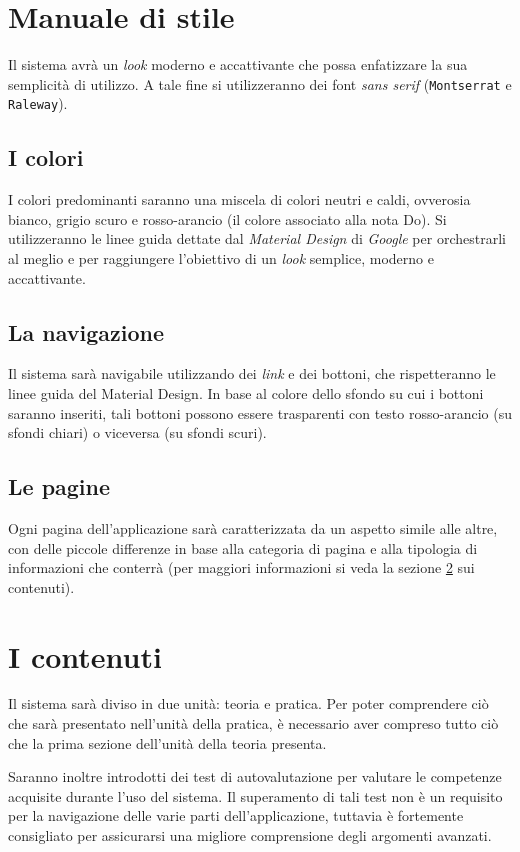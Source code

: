 \section{Manuale di stile}
Il sistema avrà un \emph{look} moderno e accattivante che possa enfatizzare la
sua semplicità di utilizzo. A tale fine si utilizzeranno dei font \emph{sans
serif} (\texttt{Montserrat} e \texttt{Raleway}).

\subsection{I colori}
I colori predominanti saranno una miscela di colori neutri e caldi, ovverosia
bianco, grigio scuro e rosso-arancio (il colore associato alla nota Do). Si
utilizzeranno le linee guida dettate dal \emph{Material Design} di \emph{Google}
per orchestrarli al meglio e per raggiungere l'obiettivo di un \emph{look}
semplice, moderno e accattivante.

\subsection{La navigazione}
Il sistema sarà navigabile utilizzando dei \emph{link} e dei bottoni, che
rispetteranno le linee guida del Material Design. In base al colore dello sfondo
su cui i bottoni saranno inseriti, tali bottoni possono essere trasparenti con
testo rosso-arancio (su sfondi chiari) o viceversa (su sfondi scuri).

\subsection{Le pagine} 
Ogni pagina dell'applicazione sarà caratterizzata da un aspetto simile alle
altre, con delle piccole differenze in base alla categoria di pagina e alla
tipologia di informazioni che conterrà (per maggiori informazioni si veda la
sezione \ref{sec:contenuti} sui contenuti).

\section{I contenuti}\label{sec:contenuti}
Il sistema sarà diviso in due unità: teoria e pratica. Per poter comprendere ciò
che sarà presentato nell'unità della pratica, è necessario aver compreso tutto
ciò che la prima sezione dell'unità della teoria presenta.

Saranno inoltre introdotti dei test di autovalutazione per valutare le
competenze acquisite durante l'uso del sistema. Il superamento di tali test non
è un requisito per la navigazione delle varie parti dell'applicazione, tuttavia
è fortemente consigliato per assicurarsi una migliore comprensione degli
argomenti avanzati.

